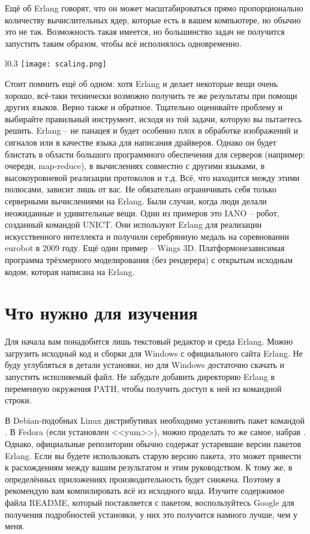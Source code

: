 Ещё об Erlang говорят, что он может масштабироваться прямо пропорционально количеству вычислительных ядер, которые есть в вашем компьютере, но обычно это не так.
Возможность такая имеется, но большинство задач не получится запустить таким образом, чтобы всё исполнялось одновременно.
\begin{wrapfigure}{l}{0.3\linewidth}
    \texttt{[image: scaling.png]}
\end{wrapfigure}

Стоит помнить ещё об одном: хотя Erlang и делает некоторые вещи очень хорошо, всё\--таки технически возможно получить те же результаты при помощи других языков.
Верно также и обратное.
Тщательно оценивайте проблему и выбирайте правильный инструмент, исходя из той задачи, которую вы пытаетесь решить.
Erlang \--- не панацея и будет особенно плох в обработке изображений и сигналов или в качестве языка для написания драйверов.
Однако он будет блистать в области большого программного обеспечения для серверов (например: очереди, map\--reduce), в вычислениях совместно с другими языками, в высокоуровневой реализации протоколов и т.д.
Всё, что находится между этими полюсами, зависит лишь от вас.
Не обязательно ограничивать себя только серверными вычислениями на Erlang.
Были случаи, когда люди делали неожиданные и удивительные вещи.
Один из примеров это IANO \--- робот, созданный командой UNICT.
Они используют Erlang для реализации искусственного интеллекта и получили серебрянную медаль на соревновании eurobot в 2009 году.
Ещё один пример \--- Wings 3D.
Платформонезависимая программа трёхмерного моделирования (без рендерера) с открытым исходным кодом, которая написана на Erlang.

\section{Что нужно для изучения}
Для начала вам понадобится лишь текстовый редактор и среда Erlang.
Можно загрузить исходный код и сборки для Windows с официального сайта Erlang.
Не буду углубляться в детали установки, но для Windows достаточно скачать и запустить исполняемый файл.
Не забудьте добавить директорию Erlang в переменную окружения PATH, чтобы получить доступ к ней из командной строки.

В Debian\--подобных Linux дистрибутивах необходимо установить пакет командой .
В Fedora (если установлен <<yum>>), можно проделать то же самое, набрав .
Однако, официальные репозитории обычно содержат устаревшие версии пакетов Erlang.
Если вы будете использовать старую версию пакета, это может привести к расхождениям между вашим результатом и этим руководством.
К тому же, в определённых приложениях производительность будет снижена.
Поэтому я рекомендую вам компилировать всё из исходного кода.
Изучите содержимое файла README, который поставляется с пакетом, воспользуйтесь Google для получения подробностей установки, у них это получится намного лучше, чем у меня.

